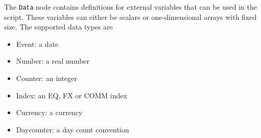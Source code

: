 The \verb+Data+ node contains definitions for external variables that can be used in the script. These variables can
either be scalars or one-dimensional arrays with fixed size. The supported data types are

\begin{itemize}
\item Event: a date
\item Number: a real number
\item Counter: an integer
\item Index: an EQ, FX or COMM index
\item Currency: a currency
\item Daycounter: a day count convention
\end{itemize}

